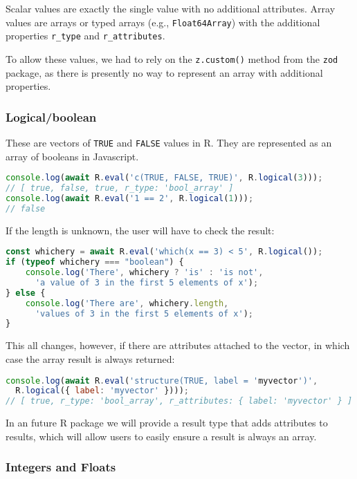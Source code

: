 \documentclass{article}
\newcommand{\pkg}[1]{\texttt{#1}}
\newcommand{\cmd}[1]{\texttt{#1}}
\newcommand{\prog}[1]{{\sf #1}}
\newcommand{\R}{\prog{R}}
\begin{document}
Scalar values are exactly the single value with no additional attributes.
Array values are arrays or typed arrays (e.g., \cmd{Float64Array}) with the additional properties \cmd{r\_type} and \cmd{r\_attributes}.

To allow these values, we had to rely on the \cmd{z.custom()} method from the \pkg{zod} package, as there is presently no way to represent an array with additional properties.

\subsubsection{Logical/boolean}
\label{sec:boolean}

These are vectors of \cmd{TRUE} and \cmd{FALSE} values in \R{}.
They are represented as an array of booleans in Javascript.
\begin{lstlisting}[language=Javascript, numbers=none]
console.log(await R.eval('c(TRUE, FALSE, TRUE)', R.logical(3)));
// [ true, false, true, r_type: 'bool_array' ]
console.log(await R.eval('1 == 2', R.logical(1)));
// false
\end{lstlisting}

If the length is unknown, the user will have to check the result:
\begin{lstlisting}[language=Javascript, numbers=none]
const whichery = await R.eval('which(x == 3) < 5', R.logical());
if (typeof whichery === "boolean") {
    console.log('There', whichery ? 'is' : 'is not',
      'a value of 3 in the first 5 elements of x');
} else {
    console.log('There are', whichery.length,
      'values of 3 in the first 5 elements of x');
}
\end{lstlisting}

This all changes, however, if there are attributes attached to the vector, in which case the array result is always returned:
\begin{lstlisting}[language=Javascript, numbers=none]
console.log(await R.eval('structure(TRUE, label = 'myvector')',
  R.logical({ label: 'myvector' })));
// [ true, r_type: 'bool_array', r_attributes: { label: 'myvector' } ]
\end{lstlisting}

In an future \R{} package we will provide a result type that adds attributes to results, which will allow users to easily ensure a result is always an array.

\subsubsection{Integers and Floats}
\label{sec:numeric}
\end{document}
